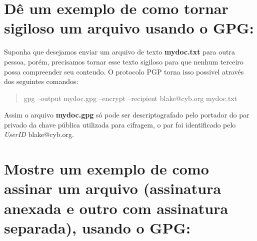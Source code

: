 \documentclass[12pt, letterpaper]{article}
\begin{document}
\section{Dê um exemplo de como tornar sigiloso um arquivo usando o GPG:}

Suponha que desejamos enviar um arquivo de texto \textbf{mydoc.txt} para outra pessoa, porém,
precisamos tornar esse texto sigiloso para que nenhum terceiro possa compreender seu conteudo.
O protocolo PGP torna isso possivel através dos seguintes comandos:
\begin{quote}
  gpg --output mydoc.gpg --encrypt --recipient blake@cyb.org mydoc.txt
\end{quote}
Assim o arquivo \textbf{mydoc.gpg} só pode ser descriptografado pelo portador do par privado da chave pública utilizada
para cifragem, o par foi identificado pelo \textit{UserID} blake@cyb.org.

\section{Mostre um exemplo de como assinar um arquivo (assinatura anexada e outro com assinatura separada), usando o GPG:}
\end{document}
